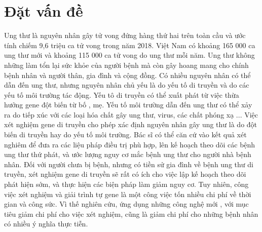 \documentclass[../DoAn.tex]{subfiles}
\begin{document}
\section{Đặt vấn đề}
\label{sec:dvd}
Ung thư là nguyên nhân gây tử vong đứng hàng thứ hai trên toàn cầu và ước tính chiếm 9,6 triệu ca tử vong trong năm 2018. Việt Nam có khoảng 165 000 ca ung thư mới và khoảng 115 000 ca tử vong do ung thư mỗi năm. Ung thư không những làm tổn lại sức khỏe của người bệnh mà còn gây hoang mang cho chính bệnh nhân và người thân, gia đình và cộng đồng. Có nhiều nguyên nhân có thể dẫn đến ung thư, nhưng nguyên nhân chủ yếu là do yếu tố di truyền và do các yếu tố môi trường tác động. Yếu tô di truyền có thể xuất phát từ việc thừa hưởng gene đột biến từ bố , mẹ. Yếu tố môi trường dẫn đến ung thư có thể xảy ra do tiếp xúc với các loại hóa chất gây ung thư, virus, các chất phóng xạ ... Việc xét nghiệm gene di truyền cho phép xác định nguyên nhân gây ung thư là do đột biến di truyền hay do yếu tố môi trường. Bác sĩ có thể căn cứ vào kết quả xét nghiêm để đưa ra các liệu pháp điều trị phù hợp, lên kế hoạch theo dõi các bệnh ung thư thứ phát, và ước lượng nguy cơ mắc bệnh ung thư cho người nhà bệnh nhân. Đối với người chưa bị bệnh, nhưng có tiền sử gia đình về bệnh ung thư di truyền, xét nghiệm gene di truyền sẽ rất có ích cho việc lập kế hoạch theo dõi phát hiện sớm, và thực hiện các biện pháp làm giảm nguy cơ. Tuy nhiên, công việc xét nghiệm và giải trình tự gene là một công việc tốn nhiều chi phí về thời gian và công sức. Vì thế nghiên cứu, ứng dụng những công nghệ mới , với mục tiêu giảm chi phí cho việc xét nghiệm, cũng là giảm chi phí cho những bệnh nhân có nhiều ý nghĩa thực tiễn.
\end{document}
